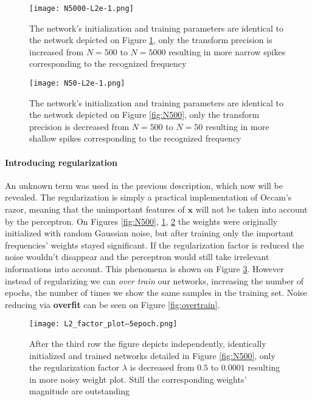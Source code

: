 \begin{figure}
	\centering
	\texttt{[image: N5000-L2e-1.png]}
	\caption{The network's initialization and training parameters are identical to the network depicted on Figure \ref{fig:N5000}, only the transform precision is increased from $N=500$ to $N=5000$ resulting in more narrow spikes corresponding to the recognized frequency}
	
	\label{fig:N5000}
\end{figure}


\begin{figure}
	\centering
	\texttt{[image: N50-L2e-1.png]}
	\caption{The network's initialization and training parameters are identical to the network depicted on Figure \ref{fig:N500}, only the transform precision is decreased from $N=500$ to $N=50$ resulting in more shallow spikes corresponding to the recognized frequency}
	
	\label{fig:N50}
\end{figure}

\paragraph{Introducing regularization}
An unknown term was used in the previous description, which now will be revealed.
The regularization is simply a practical implementation of Occam's razor, meaning that the unimportant features of $\mathbf{x}$ will not be taken into account by the perceptron. On Figures \ref{fig:N500}, \ref{fig:N5000},  \ref{fig:N50} the weights were originally initialized with random Gaussian noise, but after training only the important frequencies' weights stayed significant. If the regularization factor is reduced the noise wouldn't disappear and the perceptron would still take irrelevant informations into account. This phenomena is shown on Figure \ref{fig:reg}. However instead of regularizing we can \emph{over train} our networks, increasing the number of epochs, the number of times we show the same samples in the training set. Noise reducing via \textbf{overfit} can be seen on Figure \ref{fig:overtrain}. 


\begin{figure}
	\centering
	\texttt{[image: L2\_factor\_plot--5epoch.png]}
	\caption{After the third row the figure depicts independently, identically initialized and trained networks detailed in Figure \ref{fig:N500}, only the regularization factor $\lambda$ is decreased from $0.5$ to $0.0001$ resulting in more noisy weight plot. Still the  corresponding weights' magnitude are outstanding}
	
	\label{fig:reg}
\end{figure}

